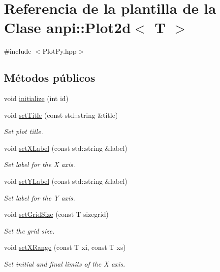 \hypertarget{classanpi_1_1Plot2d}{}\section{Referencia de la plantilla de la Clase anpi\+:\+:Plot2d$<$ T $>$}
\label{classanpi_1_1Plot2d}


{\ttfamily \#include $<$Plot\+Py.\+hpp$>$}

\subsection*{Métodos públicos}
\begin{DoxyCompactItemize}
\item 
void \hyperlink{classanpi_1_1Plot2d_ac6fb0ae9c26f3779b408f239026455ba}{initialize} (int id)
\item 
void \hyperlink{classanpi_1_1Plot2d_a4346f9f252a2637696ef94ce3755d04a}{set\+Title} (const std\+::string \&title)
\begin{DoxyCompactList}\small\item\em Set plot title. \end{DoxyCompactList}\item 
void \hyperlink{classanpi_1_1Plot2d_a64b1163ea264ff3eec9f222d82b92052}{set\+X\+Label} (const std\+::string \&label)
\begin{DoxyCompactList}\small\item\em Set label for the X axis. \end{DoxyCompactList}\item 
void \hyperlink{classanpi_1_1Plot2d_a689b16faa995ca545fe13088cbd382a5}{set\+Y\+Label} (const std\+::string \&label)
\begin{DoxyCompactList}\small\item\em Set label for the Y axis. \end{DoxyCompactList}\item 
void \hyperlink{classanpi_1_1Plot2d_a24be2607e97fdf82267c53f1cdc1c620}{set\+Grid\+Size} (const T sizegrid)
\begin{DoxyCompactList}\small\item\em Set the grid size. \end{DoxyCompactList}\item 
void \hyperlink{classanpi_1_1Plot2d_aad762639127c43070ba584a3c438cf52}{set\+X\+Range} (const T xi, const T xs)
\begin{DoxyCompactList}\small\item\em Set initial and final limits of the X axis. \end{DoxyCompactList}\item 

\end{DoxyCompactItemize}
